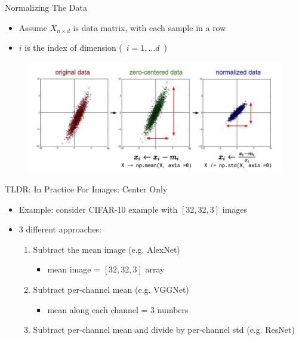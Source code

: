 \documentclass[serif, aspectratio=169]{beamer}
\begin{document}
\begin{frame}{Normalizing The Data}
	\begin{itemize}
		\item Assume $X_{n \times d}$ is data matrix, with each sample in a row
		\item $i$ is the index of dimension (\ $i = 1, \dots d$\ )
	\end{itemize}
	\begin{figure}[htpb]
		\begin{center}
			\includegraphics[keepaspectratio, scale=0.3]{pic/normaliz}
		\end{center}
	\end{figure}
\end{frame}

\begin{frame}{TLDR: In Practice For Images: Center Only}
	\begin{itemize}
		\item Example: consider CIFAR-10 example with $[32,32,3]$ images
		\item 3 different approaches:
		\begin{enumerate}
		\item Subtract the mean image (e.g. AlexNet)
			\begin{itemize}
				\item mean image = $[32,32,3]$ array
			\end{itemize}
		\item Subtract per-channel mean (e.g. VGGNet)
			\begin{itemize}
				\item mean along each channel = 3 numbers
			\end{itemize}		
		\item Subtract per-channel mean and divide by per-channel std (e.g. ResNet)
		\end{enumerate}
	\end{itemize}
\end{frame}
\end{document}
